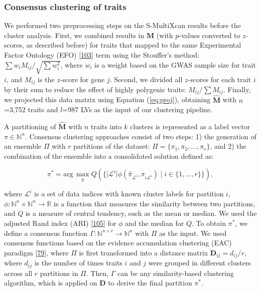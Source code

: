 \documentclass[
        11pt,
]{article}
\begin{document}
\hypertarget{sec:methods:clustering}{%
\subsubsection{Consensus clustering of traits}\label{sec:methods:clustering}}

We performed two preprocessing steps on the S-MultiXcan results before the cluster analysis.
First, we combined results in \(\mathbf{M}\) (with \(p\)-values converted to \(z\)-scores, as described before) for traits that mapped to the same Experimental Factor Ontology (EFO) {[}\protect\hyperlink{ref-9okjVu3s}{103}{]} term using the Stouffer's method: \(\sum w_i M_{ij} / \sqrt{\sum w_i^2}\), where \(w_i\) is a weight based on the GWAS sample size for trait \(i\), and \(M_{ij}\) is the \(z\)-score for gene \(j\).
Second, we divided all \(z\)-scores for each trait \(i\) by their sum to reduce the effect of highly polygenic traits: \(M_{ij} / \sum M_{ij}\).
Finally, we projected this data matrix using Equation (\ref{eq:proj}), obtaining \(\hat{\mathbf{M}}\) with \(n\)=3,752 traits and \(l\)=987 LVs as the input of our clustering pipeline.

A partitioning of \(\hat{\mathbf{M}}\) with \(n\) traits into \(k\) clusters is represented as a label vector \(\pi \in \mathbb{N}^n\).
Consensus clustering approaches consist of two steps:
1) the generation of an ensemble \(\Pi\) with \(r\) partitions of the dataset: \(\Pi=\{\pi_1, \pi_2, \ldots, \pi_r\}\),
and 2) the combination of the ensemble into a consolidated solution defined as:

\begin{equation}
\pi^* = \mathrm{arg}\,\underset{\hat{\pi}}{\max} Q(\{ \lvert \mathcal{L}^i \lvert \phi(\hat{\pi}_{\mathcal{L}^i}, \pi_{i \mathcal{L}^i}) \mid i \in \{1,\ldots,r\} \}),
\label{eq:consensus:obj_func}\end{equation}

where \(\mathcal{L}^i\) is a set of data indices with known cluster labels for partition \(i\),
\(\phi\colon \mathbb{N}^n \times \mathbb{N}^n \to \mathbb{R}\) is a function that measures the similarity between two partitions,
and \(Q\) is a measure of central tendency, such as the mean or median.
We used the adjusted Rand index (ARI) {[}\protect\hyperlink{ref-e4AuoW8N}{105}{]} for \(\phi\) and the median for \(Q\).
To obtain \(\pi^*\), we define a consensus function \(\Gamma\colon \mathbb{N}^{n \times r} \to \mathbb{N}^n\) with \(\Pi\) as the input.
We used consensus functions based on the evidence accumulation clustering (EAC) paradigm {[}\protect\hyperlink{ref-cuROQDFa}{79}{]}, where \(\Pi\) is first transformed into a distance matrix
\(\mathbf{D}_{ij} = d_{ij} / r\),
where \(d_{ij}\) is the number of times traits \(i\) and \(j\) were grouped in different clusters across all \(r\) partitions in \(\Pi\).
Then, \(\Gamma\) can be any similarity-based clustering algorithm, which is applied on \(\mathbf{D}\) to derive the final partition \(\pi^*\).
\end{document}
